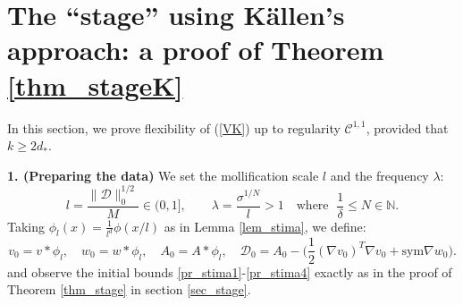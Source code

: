 \documentclass[reqno,twoside,11pt]{amsart}
\newcommand{\sym}{\mathrm{sym}}
\numberwithin{equation}{section}
\theoremstyle{plain}
\theoremstyle{definition}
\begin{document}
\section{The ``stage'' using K\"allen's approach: a proof of Theorem
  \ref{thm_stageK}}\label{sec3.5} 

In this section, we prove flexibility of (\ref{VK}) up to regularity
$\mathcal{C}^{1,1}$, provided that $k\geq 2d_*$.

\medskip


\smallskip

{\bf 1. (Preparing the data)} We set the mollification scale $l$ and the frequency $\lambda$:
\begin{equation}\label{defi_lK} 
l=\frac{\|\mathcal{D}\|_0^{1/2}}{M}\in (0, 1], \qquad \lambda =
\frac{\sigma^{1/N}}{l} >1 \quad \mbox{where } \; \frac{1}{\delta} \leq
N \in \mathbb{N}.
\end{equation}
Taking $\phi_l (x) = \frac{1}{l^d}\phi(x/l)$ as in Lemma \ref{lem_stima}, we define:
$$v_0=v\ast \phi_l,\quad w_0=w\ast \phi_l, \quad A_0=A\ast \phi_l,
\quad {\mathcal{D}}_0= A_0-\big(\frac{1}{2}(\nabla v_0)^T\nabla v_0 + \sym\nabla w_0\big).$$
and observe the initial bounds \ref{pr_stima1}-\ref{pr_stima4} exactly as in the proof
of Theorem \ref{thm_stage} in section \ref{sec_stage}.

\bigskip
\end{document}
